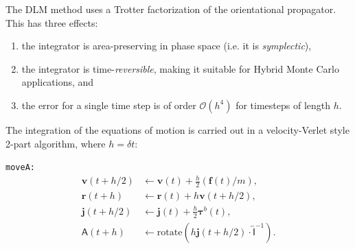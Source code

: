 \documentclass[letterpaper]{report}
\begin{document}
The DLM method uses a Trotter factorization of the orientational
propagator.  This has three effects:
\begin{enumerate}
\item the integrator is area-preserving in phase space (i.e. it is
{\it symplectic}),
\item the integrator is time-{\it reversible}, making it suitable for Hybrid
Monte Carlo applications, and
\item the error for a single time step is of order $\mathcal{O}\left(h^4\right)$
for timesteps of length $h$.
\end{enumerate}

The integration of the equations of motion is carried out in a
velocity-Verlet style 2-part algorithm, where $h= \delta t$:

{\tt moveA:}
\begin{align*}
\mathbf{v}\left(t + h / 2\right)  &\leftarrow  \mathbf{v}(t) 
	+ \frac{h}{2} \left( \mathbf{f}(t) / m \right), \\
%
\mathbf{r}(t + h) &\leftarrow \mathbf{r}(t) 
	+ h  \mathbf{v}\left(t + h / 2 \right), \\
%
\mathbf{j}\left(t + h / 2 \right)  &\leftarrow \mathbf{j}(t) 
	+ \frac{h}{2} \mathbf{\tau}^b(t), \\
%
\mathsf{A}(t + h) &\leftarrow \mathrm{rotate}\left( h \mathbf{j}
	(t + h / 2) \cdot \overleftrightarrow{\mathsf{I}}^{-1} \right).
\end{align*}
\end{document}
